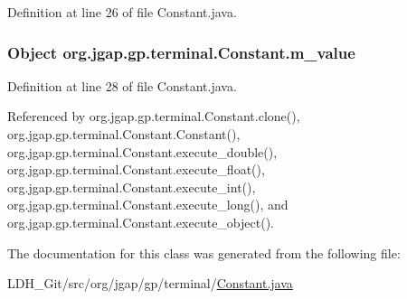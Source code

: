 Definition at line 26 of file Constant.\-java.

\hypertarget{classorg_1_1jgap_1_1gp_1_1terminal_1_1_constant_a4671deeefccfbaf5d342fe23095ae46e}{
\subsubsection[{m\-\_\-value}]{\setlength{\rightskip}{0pt plus 5cm}Object org.\-jgap.\-gp.\-terminal.\-Constant.\-m\-\_\-value\hspace{0.3cm}{\ttfamily [private]}}}\label{classorg_1_1jgap_1_1gp_1_1terminal_1_1_constant_a4671deeefccfbaf5d342fe23095ae46e}


Definition at line 28 of file Constant.\-java.



Referenced by org.\-jgap.\-gp.\-terminal.\-Constant.\-clone(), org.\-jgap.\-gp.\-terminal.\-Constant.\-Constant(), org.\-jgap.\-gp.\-terminal.\-Constant.\-execute\-\_\-double(), org.\-jgap.\-gp.\-terminal.\-Constant.\-execute\-\_\-float(), org.\-jgap.\-gp.\-terminal.\-Constant.\-execute\-\_\-int(), org.\-jgap.\-gp.\-terminal.\-Constant.\-execute\-\_\-long(), and org.\-jgap.\-gp.\-terminal.\-Constant.\-execute\-\_\-object().



The documentation for this class was generated from the following file\-:\begin{DoxyCompactItemize}
\item 
L\-D\-H\-\_\-\-Git/src/org/jgap/gp/terminal/\hyperlink{_constant_8java}{Constant.\-java}\end{DoxyCompactItemize}
